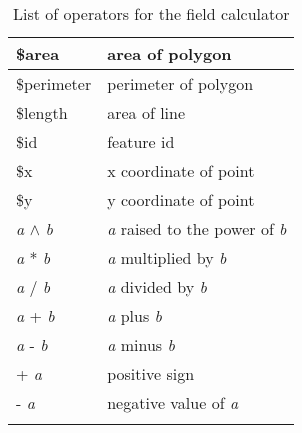 \begin{center}
{\begin{longtable}{|p{4cm}|p{10cm}|}
\hline \$area & area of polygon \\
\hline \$perimeter & perimeter of polygon \\
\hline \$length & area of line \\
\hline \$id & feature id \\
\hline \$x & x coordinate of point \\
\hline \$y & y coordinate of point \\
\hline \textit{a} $\wedge$ \textit{b} & \textit{a} raised to the power of \textit{b} \\
\hline \textit{a} * \textit{b} & \textit{a} multiplied by \textit{b} \\
\hline \textit{a} / \textit{b} & \textit{a} divided by \textit{b} \\
\hline \textit{a} + \textit{b} & \textit{a} plus \textit{b} \\
\hline \textit{a} - \textit{b} & \textit{a} minus \textit{b} \\
\hline + \textit{a} & positive sign \\
\hline - \textit{a} & negative value of \textit{a} \\
\hline 
\caption{List of operators for the field calculator}\\
\end{longtable}}
\end{center}
